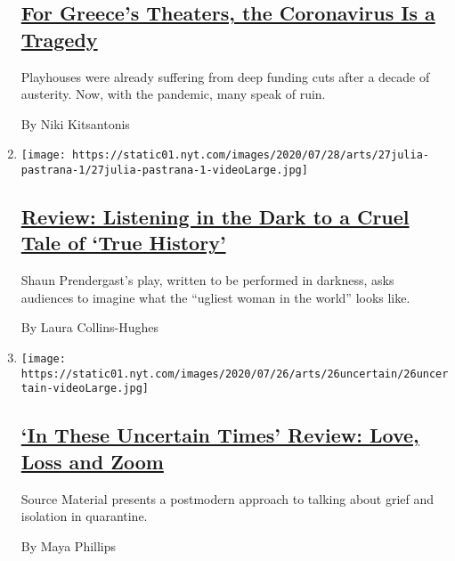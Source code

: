 \begin{enumerate}
{  \subsection{\texorpdfstring{\href{/2020/07/30/theater/greece-theater-austerity-coronavirus.html}{For
  Greece's Theaters, the Coronavirus Is a
  Tragedy}}{For Greece's Theaters, the Coronavirus Is a Tragedy}}\label{for-greeces-theaters-the-coronavirus-is-a-tragedy}}

  Playhouses were already suffering from deep funding cuts after a
  decade of austerity. Now, with the pandemic, many speak of ruin.

  By Niki Kitsantonis
\item
  \texttt{[image: https://static01.nyt.com/images/2020/07/28/arts/27julia-pastrana-1/27julia-pastrana-1-videoLarge.jpg]}

  \hypertarget{review-listening-in-the-dark-to-a-cruel-tale-of-true-history}{%
  \subsection{\texorpdfstring{\href{/2020/07/27/theater/true-history-julia-pastrana-review.html}{Review:
  Listening in the Dark to a Cruel Tale of `True
  History'}}{Review: Listening in the Dark to a Cruel Tale of `True History'}}\label{review-listening-in-the-dark-to-a-cruel-tale-of-true-history}}

  Shaun Prendergast's play, written to be performed in darkness, asks
  audiences to imagine what the ``ugliest woman in the world'' looks
  like.

  By Laura Collins-Hughes
\item
  \texttt{[image: https://static01.nyt.com/images/2020/07/26/arts/26uncertain/26uncertain-videoLarge.jpg]}

  \hypertarget{in-these-uncertain-times-review-love-loss-and-zoom}{%
  \subsection{\texorpdfstring{\href{/2020/07/26/theater/in-these-uncertain-times-review.html}{`In
  These Uncertain Times' Review: Love, Loss and
  Zoom}}{`In These Uncertain Times' Review: Love, Loss and Zoom}}\label{in-these-uncertain-times-review-love-loss-and-zoom}}

  Source Material presents a postmodern approach to talking about grief
  and isolation in quarantine.

  By Maya Phillips
\end{enumerate}


